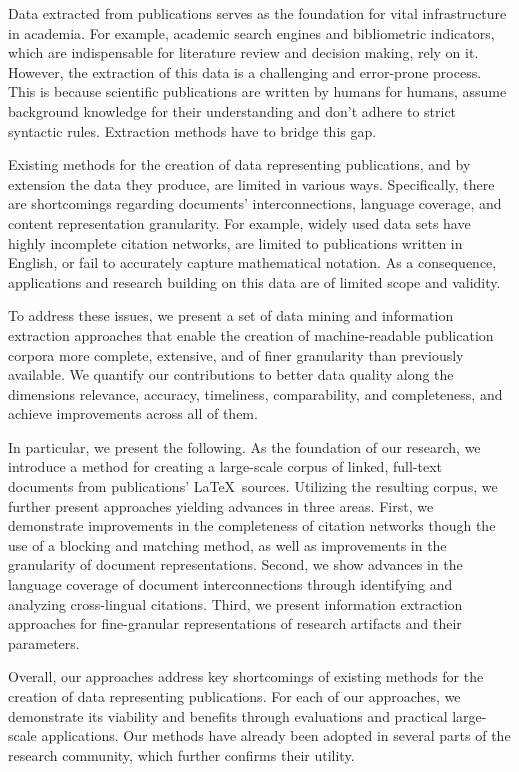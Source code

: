 \Abstract{}
Data extracted from publications serves as the foundation for vital infrastructure in academia.
For example, academic search engines and bibliometric indicators, which are indispensable for literature review and decision making, %
rely on it.
However, the extraction of this data is a challenging and error-prone process.
This is because scientific publications are written by humans for humans, assume background knowledge for their understanding and don't adhere to strict syntactic rules. Extraction methods have to bridge this gap.

Existing methods for the creation of data representing publications, and by extension the data they produce, are limited in various ways. Specifically, there are shortcomings regarding documents' interconnections, language coverage, and content representation granularity. For example, widely used data sets have highly incomplete citation networks, are limited to publications written in English, or fail to accurately capture mathematical notation. As a consequence, applications and research building on this data are of limited scope and validity.

To address these issues, we present a set of data mining and information extraction approaches that enable the creation of machine-readable publication corpora more complete, extensive, and of finer granularity than previously available. We quantify our contributions to better data quality along the dimensions relevance, accuracy, timeliness, comparability, and completeness, and achieve improvements across all of them.

In particular, we present the following.
As the foundation of our research, we introduce a method for creating a large-scale corpus of linked, full-text documents from publications' \LaTeX\ sources.
Utilizing the resulting corpus, we further present approaches yielding advances in three areas.
First, we demonstrate improvements in the completeness of citation networks though the use of a blocking and matching method, as well as improvements in the granularity of document representations.
Second, we show advances in the language coverage of document interconnections through identifying and analyzing cross-lingual citations.
Third, we present information extraction approaches for fine-granular representations of research artifacts and their parameters.

Overall, our approaches address key shortcomings of existing methods for the creation of data representing publications.
For each of our approaches, we demonstrate its viability and benefits through evaluations and practical large-scale applications.
Our methods have already been adopted in several parts of the research community, which further confirms their utility.
